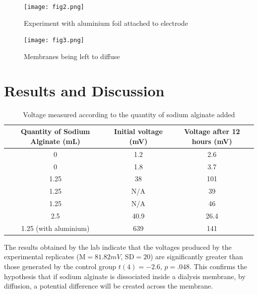 \documentclass[letterpaper]{article}
\begin{document}

\begin{figure}
	\centering
	\texttt{[image: fig2.png]}
	\caption{Experiment with aluminium foil attached to electrode}
	\label{fig:2}
\end{figure}

\begin{figure}
	\centering
	\texttt{[image: fig3.png]}
	\caption{Membranes being left to diffuse}
	\label{fig:3}
\end{figure}


\section{Results and Discussion}
\label{sec:results and Discussion}


\begin{table}[H]
	\centering
	\label{tab:my-table}
	\begin{tabular}{|c|c|c|}
	\hline
	Quantity of Sodium Alginate (mL) & Initial voltage (mV) & Voltage after 12 hours (mV) \\ \hline
	0                                & 1.2                  & 2.6                         \\
	0                                & 1.8                  & 3.7                         \\ \hline
	1.25                             & 38                   & 101                         \\
	1.25                             & N/A                  & 39                          \\
	1.25                             & N/A                  & 46                          \\ \hline
	2.5                              & 40.9                 & 26.4                        \\
	1.25 (with aluminium)            & 639                  & 141                         \\ \hline
	\end{tabular}
	\caption{Voltage measured according to the quantity of sodium alginate added}
	
\end{table}

The results obtained by the lab indicate that the voltages produced by the experimental
 replicates (M$=81.82mV$, SD$=20$) are significantly greater than those generated by the 
 control group $t(4) = -2.6$, $p = .048$. This confirms the hypothesis that if sodium alginate 
 is dissociated inside a dialysis membrane, by diffusion, a potential difference will be 
 created across the membrane.
\end{document}
